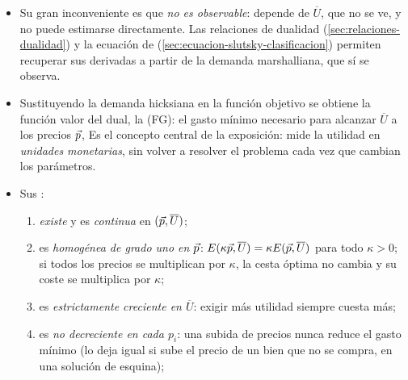 \documentclass[11pt]{article}
\begin{document}
\begin{itemize}
\begin{enumerate}
  \item cumple la : $(\vect{p}\,'-\vect{p})\cdot\big(\vect{h}(\vect{p}\,',\overline{U})-\vect{h}(\vect{p},\overline{U})\big)\leq 0$ y, en particular, $\partial h_i(\vect{p},\overline{U})/\partial p_i\leq 0$. Precio y cantidad compensada nunca se mueven en el mismo sentido: un bien  es imposible en la demanda hicksiana.\footnote{La razón de ser de un bien  es un efecto renta de signo contrario al efecto sustitución y mayor que él en valor absoluto, y la demanda hicksiana no tiene efecto renta.} Es la diferencia fundamental con la demanda marshalliana, y se debe a la concavidad de la función de gasto, como veremos enseguida.
  \end{enumerate}
\item Su gran inconveniente es que \emph{no es observable}: depende de $\overline{U}$, que no se ve, y no puede estimarse directamente. Las relaciones de dualidad (\ref{sec:relaciones-dualidad}) y la ecuación de  (\ref{sec:ecuacion-slutsky-clasificacion}) permiten recuperar sus derivadas a partir de la demanda marshalliana, que sí se observa.
\item Sustituyendo la demanda hicksiana en la función objetivo se obtiene la función valor del dual, la  (FG): el gasto mínimo necesario para alcanzar $\overline{U}$ a los precios $\vec{p}$,
  Es el concepto central de la exposición: mide la utilidad en \emph{unidades monetarias}, sin volver a resolver el problema cada vez que cambian los parámetros.
\item Sus \nocite{MasColellWhinstonGreen1995}:
  \begin{enumerate}
  \item \emph{existe} y es \emph{continua} en $(\vec{p},\overline{U})$;
  \item es \emph{homogénea de grado uno en $\vec{p}$}: $E(\kappa\vec{p},\overline{U})=\kappa E(\vec{p},\overline{U})$ para todo $\kappa>0$; si todos los precios se multiplican por $\kappa$, la cesta óptima no cambia y su coste se multiplica por $\kappa$;
  \item es \emph{estrictamente creciente en $\overline{U}$}: exigir más utilidad siempre cuesta más;
  \item es \emph{no decreciente en cada $p_i$}: una subida de precios nunca reduce el gasto mínimo (lo deja igual si sube el precio de un bien que no se compra, en una solución de esquina);

\end{enumerate}
\end{itemize}
\end{document}
